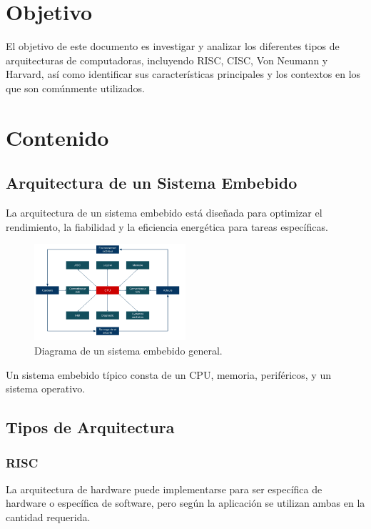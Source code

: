 \documentclass[12pt]{report}
\begin{document}
\chapter*{Objetivo}
El objetivo de este documento es investigar y analizar los diferentes tipos de arquitecturas de computadoras, incluyendo RISC, CISC, Von Neumann y Harvard, así como identificar sus características principales y los contextos en los que son comúnmente utilizados.
\newpage

\chapter{Contenido}
\section{Arquitectura de un Sistema Embebido}
La arquitectura de un sistema embebido está diseñada para optimizar el rendimiento, la fiabilidad y la eficiencia energética para tareas específicas.
\begin{figure}[H]
  \centering
  \includegraphics[width=0.5\textwidth]{image2.png}
  \caption{Diagrama de un sistema embebido general.}
  \label{fig:risc}
\end{figure}
Un sistema embebido típico consta de un CPU, memoria, periféricos, y un sistema operativo. \cite{2}
\section{Tipos de Arquitectura}
\subsection{RISC}
La arquitectura de hardware puede implementarse para ser específica de hardware o específica de software, pero según la aplicación se utilizan ambas en la cantidad requerida.
\end{document}
